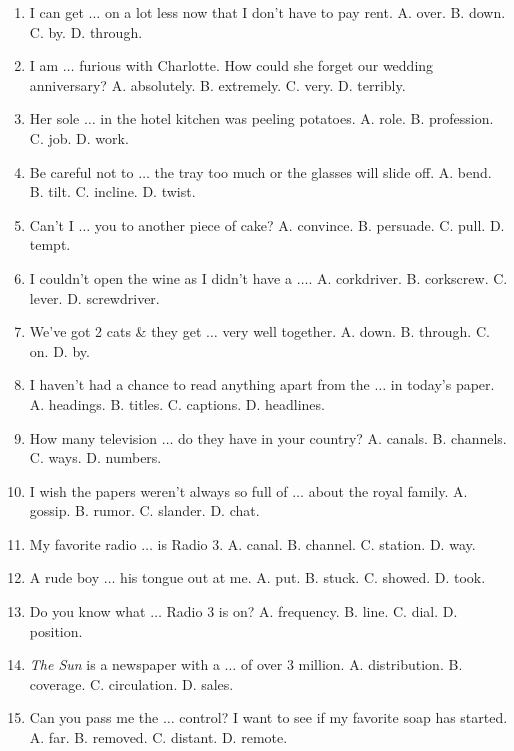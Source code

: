 \documentclass{article}
\numberwithin{equation}{section}
\begin{document}
\begin{enumerate}[leftmargin=2mm]
	\item I can get $\ldots$ on a lot less now that I don't have to pay rent. {\sf A.} over. {\sf B.} down. {\sf C.} by. {\sf D.} through.
	\item I am $\ldots$ furious with Charlotte. How could she forget our wedding anniversary? {\sf A.} absolutely. {\sf B.} extremely. {\sf C.} very. {\sf D.} terribly.
	\item Her sole $\ldots$ in the hotel kitchen was peeling potatoes. {\sf A.} role. {\sf B.} profession. {\sf C.} job. {\sf D.} work.
	\item Be careful not to $\ldots$ the tray too much or the glasses will slide off. {\sf A.} bend. {\sf B.} tilt. {\sf C.} incline. {\sf D.} twist.
	\item Can't I $\ldots$ you to another piece of cake? {\sf A.} convince. {\sf B.} persuade. {\sf C.} pull. {\sf D.} tempt.
	\item I couldn't open the wine as I didn't have a $\ldots$. {\sf A.} corkdriver. {\sf B.} corkscrew. {\sf C.} lever. {\sf D.} screwdriver.
	\item We've got 2 cats \& they get $\ldots$ very well together. {\sf A.} down. {\sf B.} through. {\sf C.} on. {\sf D.} by.
	\item I haven't had a chance to read anything apart from the $\ldots$ in today's paper. {\sf A.} headings. {\sf B.} titles. {\sf C.} captions. {\sf D.} headlines.
	\item How many television $\ldots$ do they have in your country? {\sf A.} canals. {\sf B.} channels. {\sf C.} ways. {\sf D.} numbers.
	\item I wish the papers weren't always so full of $\ldots$ about the royal family. {\sf A.} gossip. {\sf B.} rumor. {\sf C.} slander. {\sf D.} chat.
	\item My favorite radio $\ldots$ is Radio 3. {\sf A.} canal. {\sf B.} channel. {\sf C.} station. {\sf D.} way.
	\item A rude boy $\ldots$ his tongue out at me. {\sf A.} put. {\sf B.} stuck. {\sf C.} showed. {\sf D.} took.
	\item Do you know what $\ldots$ Radio 3 is on? {\sf A.} frequency. {\sf B.} line. {\sf C.} dial. {\sf D.} position.
	\item \textit{The Sun} is a newspaper with a $\ldots$ of over 3 million. {\sf A.} distribution. {\sf B.} coverage. {\sf C.} circulation. {\sf D.} sales.
	\item Can you pass me the $\ldots$ control? I want to see if my favorite soap has started. {\sf A.} far. {\sf B.} removed. {\sf C.} distant. {\sf D.} remote.

\end{enumerate}
\end{document}
